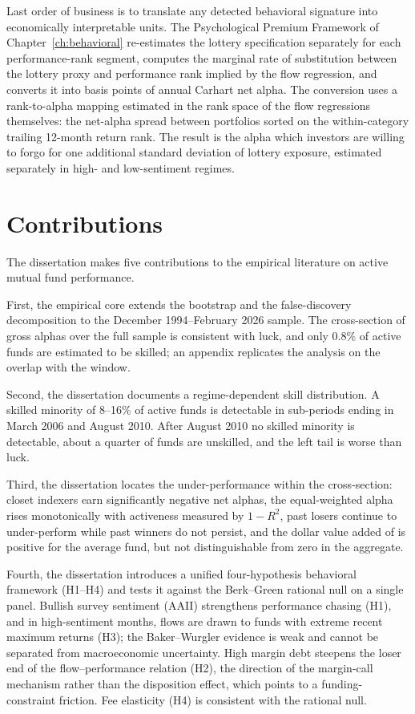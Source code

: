 \documentclass[12pt, oneside]{report}
\begin{document}
Last order of business is to translate any detected behavioral signature into economically interpretable units. The Psychological Premium Framework of Chapter~\ref{ch:behavioral} re-estimates the lottery specification separately for each performance-rank segment, computes the marginal rate of substitution between the lottery proxy and performance rank implied by the flow regression, and converts it into basis points of annual Carhart net alpha. The conversion uses a rank-to-alpha mapping estimated in the rank space of the flow regressions themselves: the net-alpha spread between portfolios sorted on the within-category trailing 12-month return rank. The result is the alpha which investors are willing to forgo for one additional standard deviation of lottery exposure, estimated separately in high- and low-sentiment regimes.

\section{Contributions}
\label{sec:contributions}

\noindent The dissertation makes five contributions to the empirical
literature on active mutual fund performance.

First, the empirical core extends the \textcite{FamaFrench2010} bootstrap
and the \textcite{BarrasScailletWermers2010} false-discovery decomposition
to the December 1994--February 2026 sample. The cross-section of gross alphas over the full sample is consistent with luck, and only 0.8\% of
active funds are estimated to be skilled; an appendix replicates the
analysis on the overlap with the \textcite{FamaFrench2010} window.

Second, the dissertation documents a regime-dependent skill distribution. A skilled minority of 8--16\% of active funds is detectable in sub-periods ending in March 2006 and August 2010. After August 2010 no skilled minority is detectable, about a quarter of funds are unskilled, and the left tail is worse than luck. 

Third, the dissertation locates the under-performance within the
cross-section: closet indexers earn significantly negative net alphas, the
equal-weighted alpha rises monotonically with activeness measured by
$1-R^2$, past losers continue to under-perform while past winners do not
persist, and the dollar value added of \textcite{BerkVanBinsbergen2015}
is positive for the average fund, but not distinguishable from zero in
the aggregate.

Fourth, the dissertation introduces a unified four-hypothesis behavioral
framework (H1--H4) and tests it against the Berk--Green rational null on a
single panel. Bullish survey sentiment (AAII) strengthens performance
chasing (H1), and in high-sentiment months, flows are drawn to funds with
extreme recent maximum returns (H3); the Baker--Wurgler evidence is weak
and cannot be separated from macroeconomic uncertainty. High margin debt
steepens the loser end of the flow--performance relation (H2), the
direction of the \textcite{BrunnermeierPedersen2009} margin-call mechanism
rather than the disposition effect, which points to a funding-constraint
friction. Fee elasticity (H4) is consistent with the rational null.
\end{document}
